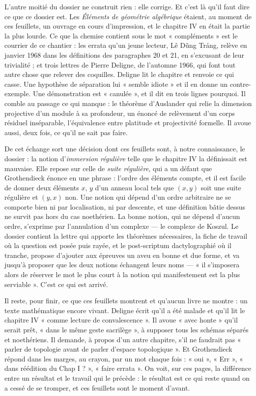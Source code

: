\documentclass[11pt,a4paper]{article}
\begin{document}
\begin{resume}
L'autre moitié du dossier ne construit rien : elle corrige. Et c'est là qu'il
faut dire ce que ce dossier est. Les \emph{Éléments de géométrie algébrique}
étaient, au moment de ces feuillets, un ouvrage en cours d'impression, et le
chapitre IV en était la partie la plus lourde. Ce que la chemise contient sous
le mot « compléments » est le courrier de ce chantier : les errata qu'un jeune
lecteur, Lê Dũng Tráng, relève en janvier 1968 dans les définitions des
paragraphes 20 et 21, en s'excusant de leur trivialité ; et trois lettres de
Pierre Deligne, de l'automne 1966, qui font tout autre chose que relever des
coquilles. Deligne lit le chapitre et renvoie ce qui casse. Une hypothèse de
séparation lui « semble idiote » et il en donne un contre-exemple. Une
démonstration est « canulée », et il dit en trois lignes pourquoi. Il comble au
passage ce qui manque : le théorème d'Auslander qui relie la dimension
projective d'un module à sa profondeur, un énoncé de relèvement d'un corps
résiduel inséparable, l'équivalence entre platitude et projectivité formelle. Il
avoue aussi, deux fois, ce qu'il ne sait pas faire.

De cet échange sort une décision dont ces feuillets sont, à notre connaissance,
le dossier : la notion d'\emph{immersion régulière} telle que le chapitre IV la
définissait est mauvaise. Elle repose sur celle de \emph{suite régulière}, qui a
un défaut que Grothendieck énonce en une phrase : l'ordre des éléments compte,
et il est facile de donner deux éléments $x$, $y$ d'un anneau local tels que
$(x,y)$ soit une suite régulière et $(y,x)$ non. Une notion qui dépend d'un ordre
arbitraire ne se comporte bien ni par localisation, ni par descente, et une
définition bâtie dessus ne survit pas hors du cas noethérien. La bonne notion,
qui ne dépend d'aucun ordre, s'exprime par l'annulation d'un complexe — le
complexe de Koszul. Le dossier contient la lettre qui apporte les théorèmes
nécessaires, la fiche de travail où la question est posée puis rayée, et le
post-scriptum dactylographié où il tranche, propose d'ajouter aux épreuves un
aveu en bonne et due forme, et va jusqu'à proposer que les deux notions
échangent leurs noms — « il s'imposera alors de réserver le mot le plus court à
la notion qui manifestement est la plus serviable ». C'est ce qui est arrivé.

Il reste, pour finir, ce que ces feuillets montrent et qu'aucun livre ne montre :
un texte mathématique encore vivant. Deligne écrit qu'il a été malade et qu'il
lit le chapitre IV « comme lecture de convalescence ». Il avoue « avec honte »
qu'il serait prêt, « dans le même geste sacrilège », à supposer tous les schémas
séparés et noethériens. Il demande, à propos d'un autre chapitre, s'il ne
faudrait pas « parler de topologie avant de parler d'espace topologique ». Et
Grothendieck répond dans les marges, au crayon, par un mot chaque fois :
« oui », « Err », « dans réédition du Chap I ? », « faire errata ». On voit, sur
ces pages, la différence entre un résultat et le travail qui le précède : le
résultat est ce qui reste quand on a cessé de se tromper, et ces feuillets sont
le moment d'avant.


\end{resume}
\end{document}
